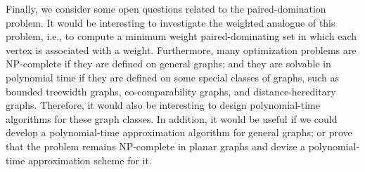 \documentclass[12pt]{article}
\begin{document}
Finally, we consider some open questions related to the paired-domination problem. It would be interesting to investigate the weighted analogue of this problem, i.e., to compute a minimum weight paired-dominating set in which each vertex is associated with a weight. Furthermore, many optimization problems are NP-complete if they are defined on general graphs; and they are solvable in polynomial time if they are defined on some special classes of graphs, such as bounded treewidth graphs, co-comparability graphs, and distance-hereditary graphs. Therefore, it would also be interesting to design polynomial-time algorithms for these graph classes. In addition, it would be useful if we could develop a polynomial-time approximation algorithm for general graphs; or prove that the problem remains NP-complete in planar graphs and devise a polynomial-time approximation scheme for it.

\small


\end{document}

